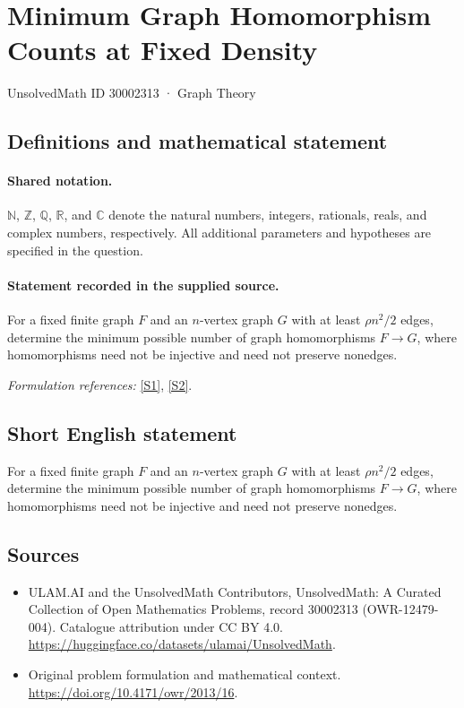 \documentclass[11pt]{article}
\newcommand{\sref}[2]{\hyperlink{source:#1:#2}{[S#2]}}
\begin{document}
\setcounter{section}{30002312}
\section{Minimum Graph Homomorphism Counts at Fixed Density}\label{30002313}
{\small UnsolvedMath ID 30002313 · Graph Theory}
\subsection{Definitions and mathematical statement}

\paragraph{Shared notation.}$\mathbb N$, $\mathbb Z$, $\mathbb Q$, $\mathbb R$, and $\mathbb C$ denote the natural numbers, integers, rationals, reals, and complex numbers, respectively. All additional parameters and hypotheses are specified in the question.


\paragraph{Statement recorded in the supplied source.}
For a fixed finite graph $F$ and an $n$-vertex graph $G$ with at least $\rho n^2/2$ edges, determine the minimum possible number of graph homomorphisms $F\to G$, where homomorphisms need not be injective and need not preserve nonedges.
\par\smallskip\textit{Formulation references:} \sref{30002313}{1}, \sref{30002313}{2}.
\subsection{Short English statement}
For a fixed finite graph $F$ and an $n$-vertex graph $G$ with at least $\rho n^2/2$ edges, determine the minimum possible number of graph homomorphisms $F\to G$, where homomorphisms need not be injective and need not preserve nonedges.
\subsection{Sources}
\begin{itemize}
\item[\hypertarget{source:30002313:1}{S1}] ULAM.AI and the UnsolvedMath Contributors, UnsolvedMath: A Curated Collection of Open Mathematics Problems, record 30002313 (OWR-12479-004). Catalogue attribution under CC BY 4.0.
\url{https://huggingface.co/datasets/ulamai/UnsolvedMath}.
\item[\hypertarget{source:30002313:2}{S2}] Original problem formulation and mathematical context.
\url{https://doi.org/10.4171/owr/2013/16}.
\end{itemize}
\label{end:30002313}
\end{document}
